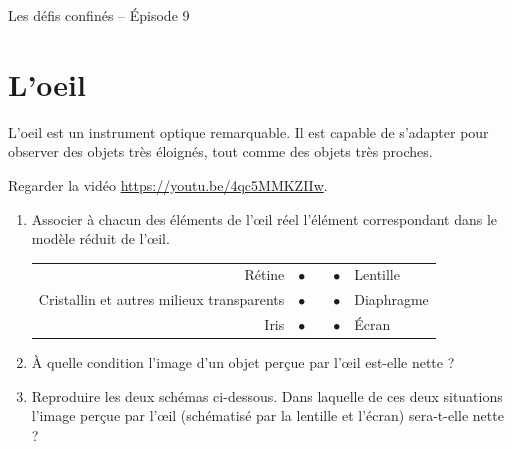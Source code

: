 \documentclass[12pt,a4paper,fleqn]{article}
\begin{document}
\begin{header}
Les défis confinés -- Épisode 9
\end{header}

\section*{L'oeil}

L'oeil est un instrument optique remarquable.
Il est capable de s'adapter pour observer des objets très éloignés, tout comme des objets très proches.

Regarder la vidéo \href{https://youtu.be/4qc5MMKZIIw}{https://youtu.be/4qc5MMKZIIw}.

\begin{enumerate}
\item Associer à chacun des éléments de l'œil réel l'élément correspondant dans le modèle réduit de l'œil.
\begin{center}
\begin{tabular}{rcccl}
Rétine & $\bullet$ & \hspace{50pt} & $\bullet$ & Lentille \\
Cristallin et autres milieux transparents & $\bullet$ & \hspace{50pt} & $\bullet$ & Diaphragme \\
Iris & $\bullet$ & \hspace{50pt} & $\bullet$ & Écran
\end{tabular}
\end{center}

\item À quelle condition l'image d'un objet perçue par l'œil est-elle nette ?

\item Reproduire les deux schémas ci-dessous.
Dans laquelle de ces deux situations l'image perçue par l'œil (schématisé par la lentille et l'écran) sera-t-elle nette ?
\end{enumerate}
\end{document}
